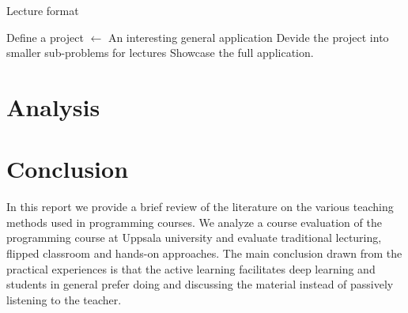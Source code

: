 \documentclass{article}
\begin{document}
\begin{algorithm}
\caption{Lecture format}
\label{alg:lect_form}
\DontPrintSemicolon
Define a project $\longleftarrow$ An interesting general application\;
Devide the project into smaller sub-problems for lectures\;
Showcase the full application.
\end{algorithm}

\section{Analysis} %
\label{sec:analysis}

\section{Conclusion} %
\label{sec:conclusion}


In this report we provide a brief review of the literature on the
various teaching methods used in programming courses.  We analyze a
course evaluation of the programming course at Uppsala university and
evaluate traditional lecturing, flipped classroom and hands-on
approaches. The main conclusion drawn from the practical experiences
is that the active learning facilitates deep learning and students in
general prefer doing and discussing the material instead of passively
listening to the teacher.



\end{document}
